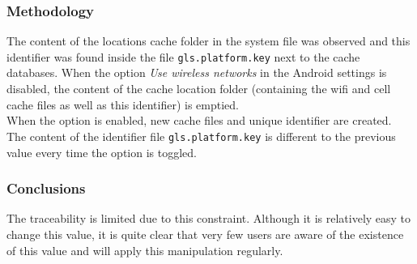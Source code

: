 \subsubsection{Methodology}

The content of the locations cache folder in the system file was observed and this identifier was found inside the file \texttt{gls.platform.key} next to the cache databases.
When the option \emph{Use wireless networks} in the Android settings is disabled, the content of the cache location folder (containing the wifi and cell cache files as well as this identifier) is emptied.\\

When the option is enabled, new cache files and unique identifier are created.
The content of the identifier file \texttt{gls.platform.key} is different to the previous value every time the option is toggled.

\subsubsection{Conclusions}

The traceability is limited due to this constraint.
Although it is relatively easy to change this value, it is quite clear that very few users are aware of the existence of this value and will apply this manipulation regularly.





